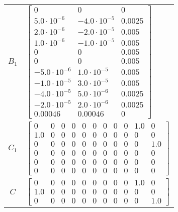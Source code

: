 \begin{tabular}{cl}
 $B_{1}$  & $\left[\begin{matrix}0 & 0 & 0\\5.0 \cdot 10^{-6} & -4.0 \cdot 10^{-5} & 0.0025\\2.0 \cdot 10^{-6} & -2.0 \cdot 10^{-5} & 0.005\\1.0 \cdot 10^{-6} & -1.0 \cdot 10^{-5} & 0.005\\0 & 0 & 0.005\\0 & 0 & 0.005\\-5.0 \cdot 10^{-6} & 1.0 \cdot 10^{-5} & 0.005\\-1.0 \cdot 10^{-5} & 3.0 \cdot 10^{-5} & 0.005\\-4.0 \cdot 10^{-5} & 5.0 \cdot 10^{-6} & 0.0025\\-2.0 \cdot 10^{-5} & 2.0 \cdot 10^{-6} & 0.0025\\0.00046 & 0.00046 & 0\end{matrix}\right]$                                                                                                                                                                                                                                                                          \\
 $C_{1}$  & $\left[\begin{array}{ccccccccccc}0 & 0 & 0 & 0 & 0 & 0 & 0 & 0 & 0 & 1.0 & 0\\1.0 & 0 & 0 & 0 & 0 & 0 & 0 & 0 & 0 & 0 & 0\\0 & 0 & 0 & 0 & 0 & 0 & 0 & 0 & 0 & 0 & 1.0\\0 & 0 & 0 & 0 & 0 & 0 & 0 & 0 & 0 & 0 & 0\\0 & 0 & 0 & 0 & 0 & 0 & 0 & 0 & 0 & 0 & 0\\0 & 0 & 0 & 0 & 0 & 0 & 0 & 0 & 0 & 0 & 0\end{array}\right]$                                                                                                                                                                                                                                                                                                                                                                                                          \\
   $C$    & $\left[\begin{array}{ccccccccccc}0 & 0 & 0 & 0 & 0 & 0 & 0 & 0 & 0 & 1.0 & 0\\1.0 & 0 & 0 & 0 & 0 & 0 & 0 & 0 & 0 & 0 & 0\\0 & 0 & 0 & 0 & 0 & 0 & 0 & 0 & 0 & 0 & 1.0\end{array}\right]$                                                                                                                                                                                                                                                                                                                                                                                                                                                                                                                                           \\

\end{tabular}
